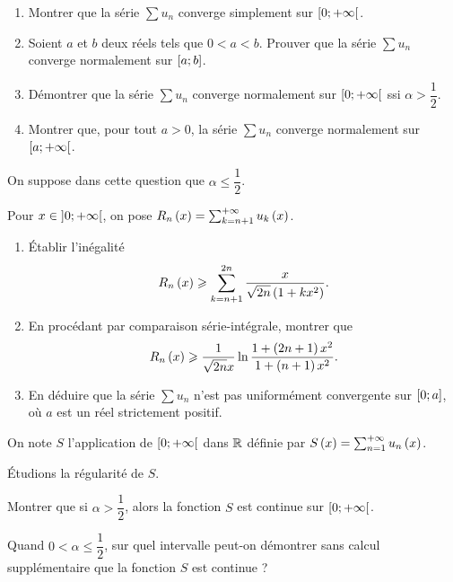 \begin{q}
\begin{enumerate}
    \item Montrer que la série \(\sum u_n\) converge simplement sur \(\left[0;+\infty\right[\). \\
    \item Soient \(a\) et \(b\) deux réels tels que \(0<a<b\). Prouver que la série \(\sum u_n\) converge normalement sur \(\left[a;b\right]\). \\
    \item Démontrer que la série \(\sum u_n\) converge normalement sur \(\left[0;+\infty\right[\) ssi \(\alpha>\dfrac{1}{2}\). \\
    \item Montrer que, pour tout \(a>0\), la série \(\sum u_n\) converge normalement sur \(\left[a;+\infty\right[\).
\end{enumerate}
\end{q}

\begin{q}
On suppose dans cette question que \(\alpha\leq\dfrac{1}{2}\).

Pour \(x\in\left]0;+\infty\right[\), on pose \(R_n\left(x\right)=\sum_{k=n+1}^{+\infty}u_k\left(x\right)\).

\begin{enumerate}
    \item Établir l'inégalité \[R_n\left(x\right)\geqslant\sum_{k=n+1}^{2n}\dfrac{x}{\sqrt{2n}\left(1+kx^2\right)}.\]
    \item En procédant par comparaison série-intégrale, montrer que \[R_n\left(x\right)\geqslant\dfrac{1}{\sqrt{2n}x}\ln\dfrac{1+\left(2n+1\right)x^2}{1+\left(n+1\right)x^2}.\]
    \item En déduire que la série \(\sum u_n\) n'est pas uniformément convergente sur \(\left[0;a\right]\), où \(a\) est un réel strictement positif.
\end{enumerate}
\end{q}

On note \(S\) l'application de \(\left[0;+\infty\right[\) dans \(\mathbb{R}\) définie par \(S\left(x\right)=\sum_{n=1}^{+\infty}u_n\left(x\right)\).

Étudions la régularité de \(S\).

\begin{q}
Montrer que si \(\alpha>\dfrac{1}{2}\), alors la fonction \(S\) est continue sur \(\left[0;+\infty\right[\).

Quand \(0<\alpha\leq\dfrac{1}{2}\), sur quel intervalle peut-on démontrer sans calcul supplémentaire que la fonction \(S\) est continue ?
\end{q}

